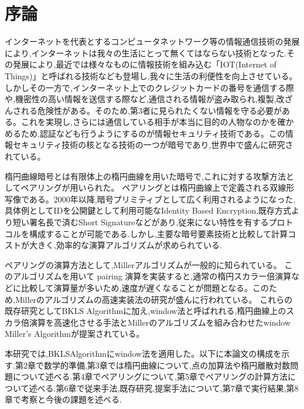\chapter{序論}
インターネットを代表とするコンピュータネットワーク等の情報通信技術の発展により,インターネットは我々の生活にとって無くてはならない技術となった.その発展により,最近では様々なものに情報技術を組み込む「IOT(Internet of Things)」と呼ばれる技術なども登場し,我々に生活の利便性を向上させている。
しかしその一方で,インターネット上でのクレジットカードの番号を通信する際や,機密性の高い情報を送信する際など,通信される情報が盗み取られ,複製,改ざんされる危険性がある。そのため,第3者に見られたくない情報を守る必要がある。これを実現し,さらには通信している相手が本当に目的の人物なのかを確かめるため,認証なども行うようにするのが情報セキュリティ技術である。この情報セキュリティ技術の核となる技術の一つが暗号であり,世界中で盛んに研究されている。

\bigskip

楕円曲線暗号とは有限体上の楕円曲線を用いた暗号で,これに対する攻撃方法としてペアリングが用いられた。
ペアリングとは楕円曲線上で定義される双線形写像である。2000年以降,暗号プリミティブとして広く利用されるようになった.具体例としてIDを公開鍵として利用可能なIdentity Based Encryption,既存方式より短い署名長で済むShort Signatureなどがあり,従来にない特性を有するプロトコルを構成することが可能である.しかし,主要な暗号要素技術と比較して計算コストが大きく,効率的な演算アルゴリズムが求められている.

\bigskip

ペアリングの演算方法として,Millerアルゴリズムが一般的に知られている。
このアルゴリズムを用いて pairing 演算を実装すると,通常の楕円スカラー倍演算などに比較して演算量が多いため,速度が遅くなることが問題となる。このため,Millerのアルゴリズムの高速実装法の研究が盛んに行われている。
これらの既存研究としてBKLS Algorithmに加え,window法と呼ばれれる,楕円曲線上のスカラ倍演算を高速化させる手法とMillerのアルゴリズムを組み合わせたwindow Miller’s Algorithmが提案されている。

\bigskip

本研究では,BKLSAlgorithmにwindow法を適用した。以下に本論文の構成を示す.第2章で数学的準備,第3章では楕円曲線について,点の加算法や楕円離散対数問題について述べる.第4章でペアリングについて,第5章でぺアリングの計算方法について述べる.第6章で従来手法,既存研究,提案手法について,第7章で実行結果,第8章で考察と今後の課題を述べる.

\bigskip

\par

